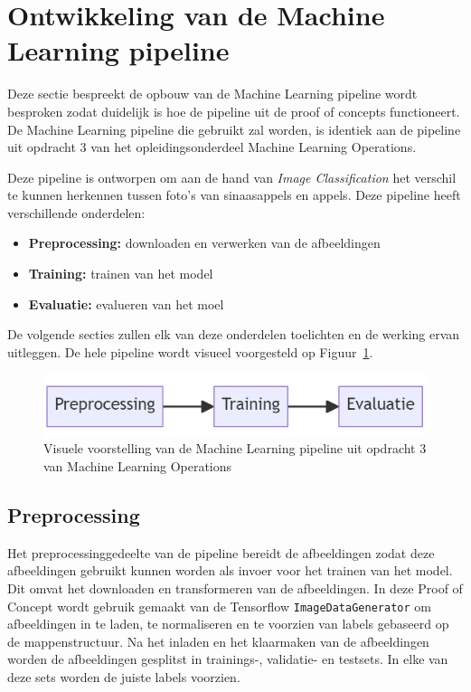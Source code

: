 \section{Ontwikkeling van de Machine Learning pipeline}

Deze sectie bespreekt de opbouw van de Machine Learning pipeline wordt besproken zodat duidelijk is hoe de pipeline uit de proof of concepts functioneert. De Machine Learning pipeline die gebruikt zal worden, is identiek aan de pipeline uit opdracht 3 van het opleidingsonderdeel Machine Learning Operations.

Deze pipeline is ontworpen om aan de hand van \textit{Image Classification} het verschil te kunnen herkennen tussen foto's van sinaasappels en appels. Deze pipeline heeft verschillende onderdelen:

\begin{itemize}
    \item \textbf{Preprocessing:} downloaden en verwerken van de afbeeldingen
    \item \textbf{Training:} trainen van het model
    \item \textbf{Evaluatie:} evalueren van het moel
\end{itemize}

De volgende secties zullen elk van deze onderdelen toelichten en de werking ervan uitleggen. De hele pipeline wordt visueel voorgesteld op Figuur~\ref{fig:Model_Flow}.

\begin{figure}
    \centering
    \includegraphics[width=0.9\linewidth]{graphics/Model_Diagram.PNG}
    \caption[Visuele voorstelling pipeline PoC]{Visuele voorstelling van de Machine Learning pipeline uit opdracht 3 van Machine Learning Operations}
    \label{fig:Model_Flow}
\end{figure}


\subsection{Preprocessing}

Het preprocessinggedeelte van de pipeline bereidt de afbeeldingen  zodat deze afbeeldingen gebruikt kunnen worden als invoer voor het trainen van het model. Dit omvat het downloaden en transformeren van de afbeeldingen. In deze Proof of Concept wordt gebruik gemaakt van de Tensorflow \texttt{ImageDataGenerator} om afbeeldingen in te laden, te normaliseren en te voorzien van labels gebaseerd op de mappenstructuur. Na het inladen en het klaarmaken van de afbeeldingen worden de afbeeldingen gesplitst in trainings-, validatie- en testsets. In elke van deze sets worden de juiste labels voorzien.

